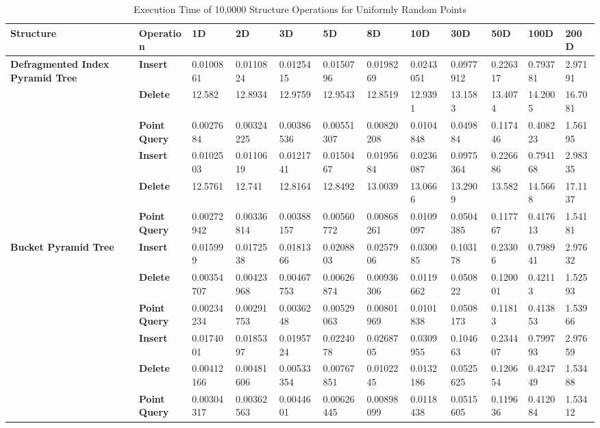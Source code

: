 \begin{landscape}

	\begin{table}
		\centering
		\begin{tabular}{|p{2cm}|l|l|l|l|l|l|l|l|l|l|l|}
			\hline
			\textbf{Structure} & \textbf{Operation} & \textbf{1D} & \textbf{2D} & \textbf{3D} & \textbf{5D} & \textbf{8D} & \textbf{10D} & \textbf{30D} & \textbf{50D} & \textbf{100D} & \textbf{200D} \\
			\hline
			\multirow{ 4}{*}{\textbf{Defragmented Index Pyramid Tree}} & \textbf{Insert} & 0.0100861 & 0.0110824 & 0.0125415 & 0.0150796 & 0.0198269 & 0.0243051 & 0.0977912 & 0.226317 & 0.793781 & 2.97191 \\
			 & \textbf{Delete} & 12.582 & 12.8934 & 12.9759 & 12.9543 & 12.8519 & 12.9391 & 13.1583 & 13.4074 & 14.2005 & 16.7081 \\
			 & \textbf{Point Query} & 0.0027684 & 0.00324225 & 0.00386536 & 0.00551307 & 0.00820208 & 0.0104848 & 0.049884 & 0.117446 & 0.408223 & 1.56195 \\
			\hline
			\multirow{ 4}{*}{\textbf{Rebuild Index Pyramid Tree}} & \textbf{Insert} & 0.0102503 & 0.0110619 & 0.0121741 & 0.0150467 & 0.0195684 & 0.0236087 & 0.0975364 & 0.226686 & 0.794168 & 2.98335 \\
			 & \textbf{Delete} & 12.5761 & 12.741 & 12.8164 & 12.8492 & 13.0039 & 13.0666 & 13.2909 & 13.582 & 14.5668 & 17.1137 \\
			 & \textbf{Point Query} & 0.00272942 & 0.00336814 & 0.00388157 & 0.00560772 & 0.00868261 & 0.0109097 & 0.0504385 & 0.117767 & 0.417613 & 1.54181 \\
			\hline
			\multirow{ 4}{*}{\textbf{Bucket Pyramid Tree}} & \textbf{Insert} & 0.015999 & 0.0172538 & 0.0181366 & 0.0208803 & 0.0257906 & 0.030085 & 0.103178 & 0.23306 & 0.798941 & 2.97632 \\
			 & \textbf{Delete} & 0.00354707 & 0.00423968 & 0.00467753 & 0.00626874 & 0.00936306 & 0.0119662 & 0.050822 & 0.120001 & 0.42113 & 1.52593 \\
			 & \textbf{Point Query} & 0.00234234 & 0.00291753 & 0.0036248 & 0.00529063 & 0.00801969 & 0.0101838 & 0.0508173 & 0.11813 & 0.413853 & 1.53966 \\
			\hline
			\multirow{ 4}{*}{\textbf{Splay Pyramid Tree}} & \textbf{Insert} & 0.0174001 & 0.0185397 & 0.0195724 & 0.0224078 & 0.0268705 & 0.0309955 & 0.104663 & 0.234407 & 0.799793 & 2.97659 \\
			 & \textbf{Delete} & 0.00412166 & 0.00481606 & 0.00533354 & 0.00767851 & 0.0102245 & 0.0132186 & 0.0525625 & 0.120654 & 0.424749 & 1.53488  \\
			 & \textbf{Point Query} & 0.00304317 & 0.00362563 & 0.0044601 & 0.00626445 & 0.00898099 & 0.0118438 & 0.0515605 & 0.119636 & 0.412084 & 1.53412 \\
			\hline
		\end{tabular}
		\caption{Execution Time of 10,0000 Structure Operations for Uniformly Random Points}
		\label{tab:perf2-randuniform}
	\end{table}


\end{landscape}
